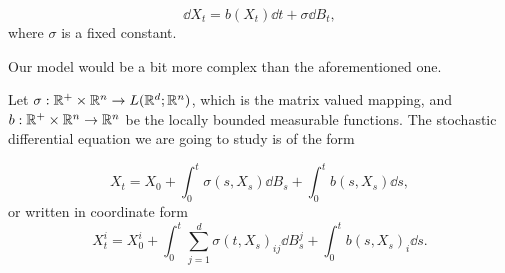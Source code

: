\documentclass[8pt,onesided]{article}
\begin{document}
\begin{equation*}
    \dd X_t=b(X_t) \dd t+\sigma \dd B_t,
\end{equation*}
where $\sigma$ is a fixed constant.

Our model would be a bit more complex than the aforementioned one. 

\begin{definition}
 Let $ \sigma: \mathbb{R}^+ \times \mathbb{R}^n \to  L(\mathbb{R}^d;\mathbb{R}^n)$, which is the matrix valued mapping, and $b:\mathbb{R}^+ \times \mathbb{R}^n \to \mathbb{R}^n$ be the locally bounded measurable functions. The stochastic differential equation we are going to study is of the form

\begin{equation}
    \label{sde}
    X_t=X_0+\int_0^t \sigma(s,X_s)\dd B_s+\int_0^t b(s,X_s) \dd s,
\end{equation}
or written in coordinate form
\begin{equation*}
    X_t^i=X_0^i+\int_0^t \sum_{j=1}^d \sigma(t,X_s)_{ij}\dd B_s^j+\int_0^t b(s,X_s)_i \dd s.
\end{equation*}
\end{definition}
\end{document}
